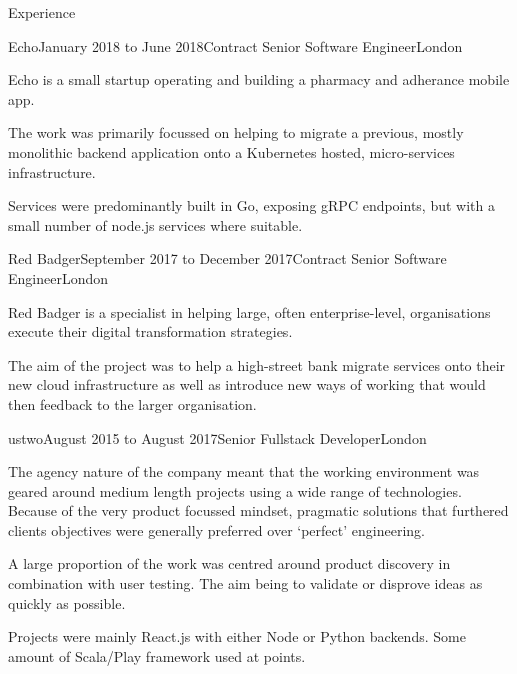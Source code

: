 \documentclass{resume} %
\begin{document}

\begin{rSection}{Experience}

  \begin{rExperience}{Echo}{January 2018 to June 2018}{Contract Senior Software Engineer}{London}
  \item Echo is a small startup operating and building a pharmacy and adherance mobile app.
  \item The work was primarily focussed on helping to migrate a previous, mostly monolithic backend application onto a Kubernetes hosted, micro-services infrastructure.
  \item Services were predominantly built in Go, exposing gRPC endpoints, but with a small number of node.js services where suitable.
  \end{rExperience}


  \begin{rExperience}{Red Badger}{September 2017 to December 2017}{Contract Senior Software Engineer}{London}
  \item Red Badger is a specialist in helping large, often enterprise-level, organisations execute their digital transformation strategies.
  \item The aim of the project was to help a high-street bank migrate services onto their new cloud infrastructure as well as introduce new ways of working that would then feedback to the larger organisation.
  \end{rExperience}


  \begin{rExperience}{ustwo}{August 2015 to August 2017}{Senior Fullstack Developer}{London}
  \item The agency nature of the company meant that the working environment was geared around medium length projects using a wide range of technologies. Because of the very product focussed mindset, pragmatic solutions that furthered clients objectives were generally preferred over `perfect' engineering.
  \item A large proportion of the work was centred around product discovery in combination with user testing. The aim being to validate or disprove ideas as quickly as possible.
  \item Projects were mainly React.js with either Node or Python backends. Some amount of Scala/Play framework used at points.
  \end{rExperience}


\end{rSection}
\end{document}
